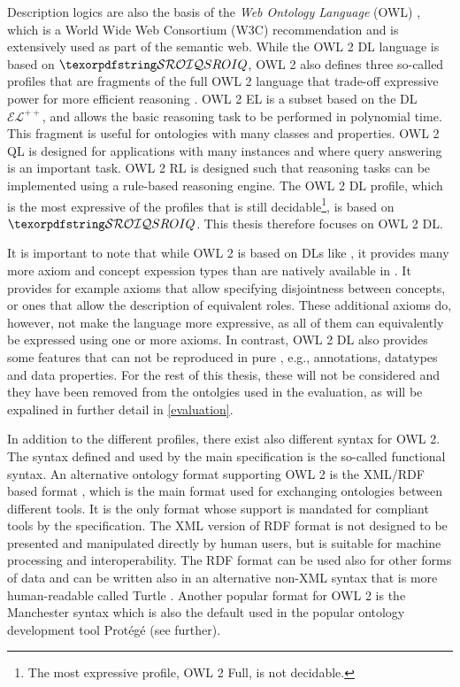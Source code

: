 
Description logics are also the basis of the \emph{Web Ontology Language} (OWL) \cite{hitzler2012primer,motik2012ontology}, which is a World Wide Web Consortium (W3C) recommendation and is extensively used as part of the semantic web. While the OWL 2 DL language is based on $\SROIQ$, OWL 2 also defines three so-called profiles that are fragments of the full OWL 2 language that trade-off expressive power for more efficient reasoning \cite{motik2012profiles,motik2012ontology}. OWL 2 EL is a subset based on the DL $\mathcal{EL}^{++}$, and allows the basic reasoning task to be performed in polynomial time. This fragment is useful for ontologies with many classes and properties. OWL 2 QL is designed for applications with many instances and where query answering is an important task. OWL 2 RL is designed such that reasoning tasks can be implemented using a rule-based reasoning engine. The OWL 2 DL profile, which is the most expressive of the profiles that is still decidable\footnote{The most expressive profile, OWL 2 Full, is not decidable.}, is based on $\SROIQ$. This thesis therefore focuses on OWL 2 DL.

It is important to note that while OWL 2 is based on DLs like \SROIQ, it provides many more axiom and concept expession types than are natively available in \SROIQ. It provides for example axioms that allow specifying disjointness between concepts, or ones that allow the description of equivalent roles. These additional axioms do, however, not make the language more expressive, as all of them can equivalently be expressed using one or more \SROIQ axioms. In contrast, OWL 2 DL also provides some features that can not be reproduced in pure \SROIQ, e.g., annotations, datatypes and data properties. For the rest of this thesis, these will not be considered and they have been removed from the ontolgies used in the evaluation, as will be expalined in further detail in \cref{evaluation}.

In addition to the different profiles, there exist also different syntax for OWL 2. The syntax defined and used by the main specification \cite{motik2012ontology} is the so-called functional syntax. An alternative ontology format supporting OWL 2 is the XML/RDF based format \cite{beckett2004rdf,motik2009rdf}, which is the main format used for exchanging ontologies between different tools. It is the only format whose support is mandated for compliant tools by the specification. The XML version of RDF format is not designed to be presented and manipulated directly by human users, but is suitable for machine processing and interoperability. The RDF format can be used also for other forms of data and can be written also in an alternative non-XML syntax that is more human-readable called Turtle \cite{beckett2008turtle}. Another popular format for OWL 2 is the Manchester syntax \cite{horridge2009manchester} which is also the default used in the popular ontology development tool Protégé (see further).

